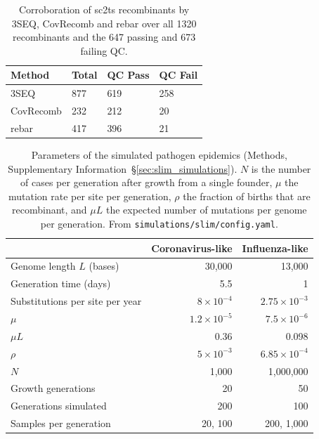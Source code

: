\documentclass[12pt]{article}
\newcommand{\supref}[1]{Supplementary Information~\S\ref{#1}}
\begin{document}



\begin{table}
\caption{Corroboration of sc2ts recombinants by 3SEQ, CovRecomb and rebar over
all 1320 recombinants and the 647 passing and 673 failing QC.
}
\label{tab:recombinant_validation}
\centering
\begin{tabular}{llll}
\toprule
Method & Total    & QC Pass & QC Fail \\
\midrule
3SEQ        & 877 & 619     & 258 \\
CovRecomb   & 232 & 212     & 20 \\
rebar       & 417 & 396     & 21 \\
\bottomrule
\end{tabular}
\end{table}

\clearpage %
\nolinenumbers %
\linenumbers
\clearpage

\begin{table}
\caption{Parameters of the simulated pathogen epidemics
(Methods, \supref{sec:slim_simulations}).
$N$ is the number of cases per generation after growth from a single founder,
$\mu$ the mutation rate per site per generation,
$\rho$ the fraction of births that are recombinant,
and $\mu L$ the expected number of mutations per genome per generation.
From \texttt{simulations/slim/config.yaml}.
}
\label{tab:slim_parameters}
\centering
\begin{tabular}{lrr}
\toprule
 & Coronavirus-like & Influenza-like \\
\midrule
Genome length $L$ (bases)         & 30,000               & 13,000 \\
Generation time (days)            & 5.5                  & 1 \\
Substitutions per site per year   & $8\times10^{-4}$     & $2.75\times10^{-3}$ \\
$\mu$                             & $1.2\times10^{-5}$   & $7.5\times10^{-6}$ \\
$\mu L$                           & 0.36                 & 0.098 \\
$\rho$                            & $5\times10^{-3}$     & $6.85\times10^{-4}$ \\
$N$                               & 1,000                & 1,000,000 \\
Growth generations                & 20                   & 50 \\
Generations simulated             & 200                  & 100 \\
Samples per generation            & 20, 100              & 200, 1,000 \\
\bottomrule
\end{tabular}
\end{table}

\end{document}
